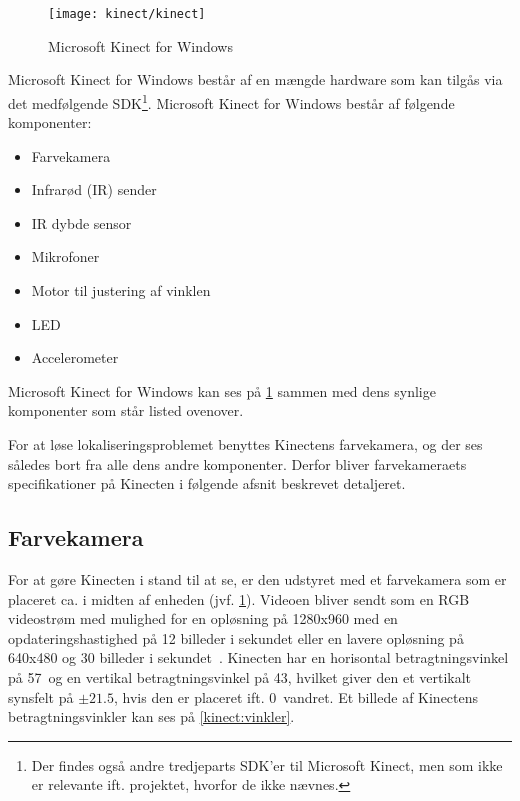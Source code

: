 %

\begin{figure}
\centering
\texttt{[image: kinect/kinect]}
\caption{Microsoft Kinect for Windows}
\label{kinect:opbygning}
\end{figure}

Microsoft Kinect for Windows består af en mængde hardware som kan tilgås via det medfølgende SDK\footnote{Der findes også andre tredjeparts SDK'er til Microsoft Kinect, men som ikke er relevante ift. projektet, hvorfor de ikke nævnes.}.
Microsoft Kinect for Windows består af følgende komponenter:

\begin{itemize}
\item Farvekamera
\item Infrarød (IR) sender
\item IR dybde sensor
\item Mikrofoner
\item Motor til justering af vinklen
\item LED
\item Accelerometer
\end{itemize}

Microsoft Kinect for Windows kan ses på \cref{kinect:opbygning} sammen med dens synlige komponenter som står listed ovenover.

For at løse lokaliseringsproblemet benyttes Kinectens farvekamera, og der ses således bort fra alle dens andre komponenter.
Derfor bliver farvekameraets specifikationer på Kinecten i følgende afsnit beskrevet detaljeret.

\subsection{Farvekamera}\label{kinect:farvekamera}
For at gøre Kinecten i stand til at se, er den udstyret med et farvekamera som er placeret ca. i midten af enheden (jvf. \cref{kinect:opbygning}).
Videoen bliver sendt som en RGB videostrøm med mulighed for en opløsning på 1280x960 med en opdateringshastighed på 12 billeder i sekundet eller en lavere opløsning på 640x480 og 30 billeder i sekundet~\cite{kinectForWindowsFeatures}.
Kinecten har en horisontal betragtningsvinkel på 57\degree~og en vertikal betragtningsvinkel på 43\degree, hvilket giver den et vertikalt synsfelt på $\pm 21.5$\degree, hvis den er placeret ift. 0\degree~vandret.
Et billede af Kinectens betragtningsvinkler kan ses på \cref{kinect:vinkler}.

